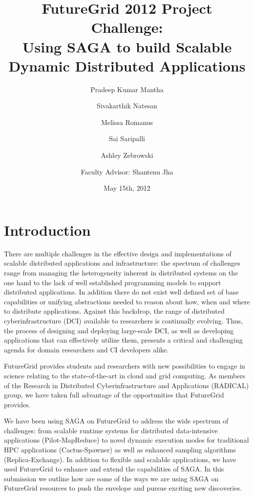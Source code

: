 \documentclass[]{paper}
\begin{document}
\title{FutureGrid 2012 Project Challenge:\\ Using SAGA to build Scalable Dynamic Distributed Applications}
\author{Pradeep Kumar Mantha 
  \and Sivakarthik Natesan 
  \and Melissa Romanus 
  \and Sai Saripalli 
  \and Ashley Zebrowski
  \and \large{Faculty Advisor: Shantenu Jha}
}
\date{May 15th, 2012}
\maketitle

\begin{abstract}
\end{abstract}

\section{Introduction}


There are multiple challenges in the effective design and implementations of scalable distributed applications and infrastructure: the spectrum of challenges range from managing the heterogeneity inherent in distributed systems on the one hand to the lack of well established programming models to support distributed applications. In addition there do not exist well defined set of base capabilities or unifying abstractions needed to reason about how, when and where to distribute applications. Against this backdrop, the range of distributed cyberinfrastructure (DCI) available to researchers is continually evolving.  Thus, the process of designing and deploying large-scale DCI, as well as developing applications that can effectively utilize them, presents a critical and challenging agenda for domain researchers and CI developers alike.

FutureGrid provides students and researchers with new possibilities to engage in science relating to the state-of-the-art in cloud and grid computing.  As members of the Research in Distributed Cyberinfrastructure and Applications (RADICAL) group, we have taken full advantage of the opportunities that FutureGrid provides.

We have been using SAGA on FutureGrid to address the wide spectrum of challenges: from scalable runtime systems for distributed data-intensive applications (Pilot-MapReduce) to novel dynamic execution modes for traditional HPC applications (Cactus-Spawner) as well as enhanced sampling algorithms (Replica-Exchange).  In addition to flexible and scalable applications, we have used FutureGrid to enhance and extend the capabilities of SAGA.  In this submission we outline how are some of the ways we are using SAGA on FutureGrid resources to push the envelope and pursue exciting new discoveries.
\end{document}
